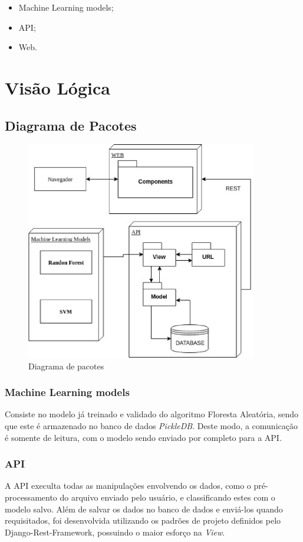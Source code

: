 \begin{anexosenv}
    \begin{itemize}
        \item Machine Learning models;
        \item API;
        \item Web.
    \end{itemize}


   \section{Visão Lógica}
   \subsection{Diagrama de Pacotes}
   \begin{figure}[!htb]
        \centering
        \includegraphics[width=0.9\textwidth]{figuras/diagrama_pacotes.eps}
        \caption{Diagrama de pacotes}
        \label{diagramadepacotes}
    \end{figure}
    \subsubsection{Machine Learning models}
    Consiste no modelo já treinado e validado do algoritmo Floresta Aleatória, sendo que este é armazenado no banco de dados \textit{PickleDB}. Deste modo, a comunicação é somente de leitura, com o modelo sendo enviado por completo para a API.
    \subsubsection{API}
    A API execulta todas as manipulações envolvendo os dados, como o pré-processamento do arquivo enviado pelo usuário, e classificando estes com o modelo salvo. Além de salvar os dados no banco de dados e enviá-los quando requisitados, foi desenvolvida utilizando os padrões de projeto definidos pelo Django-Rest-Framework, possuindo o maior esforço na \textit{View}.


\end{anexosenv}
